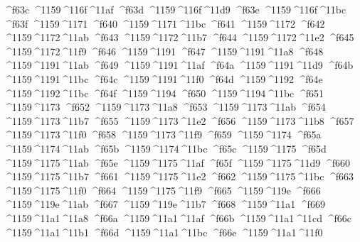 \checkit ^^^^f63c ^^^^1159^^^^116f^^^^11af
\checkit ^^^^f63d ^^^^1159^^^^116f^^^^11d9
\checkit ^^^^f63e ^^^^1159^^^^116f^^^^11bc
\checkit ^^^^f63f ^^^^1159^^^^1171
\checkit ^^^^f640 ^^^^1159^^^^1171^^^^11bc
\checkit ^^^^f641 ^^^^1159^^^^1172
\checkit ^^^^f642 ^^^^1159^^^^1172^^^^11ab
\checkit ^^^^f643 ^^^^1159^^^^1172^^^^11b7
\checkit ^^^^f644 ^^^^1159^^^^1172^^^^11e2
\checkit ^^^^f645 ^^^^1159^^^^1172^^^^11f9
\checkit ^^^^f646 ^^^^1159^^^^1191
\checkit ^^^^f647 ^^^^1159^^^^1191^^^^11a8
\checkit ^^^^f648 ^^^^1159^^^^1191^^^^11ab
\checkit ^^^^f649 ^^^^1159^^^^1191^^^^11af
\checkit ^^^^f64a ^^^^1159^^^^1191^^^^11d9
\checkit ^^^^f64b ^^^^1159^^^^1191^^^^11bc
\checkit ^^^^f64c ^^^^1159^^^^1191^^^^11f0
\checkit ^^^^f64d ^^^^1159^^^^1192
\checkit ^^^^f64e ^^^^1159^^^^1192^^^^11bc
\checkit ^^^^f64f ^^^^1159^^^^1194
\checkit ^^^^f650 ^^^^1159^^^^1194^^^^11bc
\checkit ^^^^f651 ^^^^1159^^^^1173
\checkit ^^^^f652 ^^^^1159^^^^1173^^^^11a8
\checkit ^^^^f653 ^^^^1159^^^^1173^^^^11ab
\checkit ^^^^f654 ^^^^1159^^^^1173^^^^11b7
\checkit ^^^^f655 ^^^^1159^^^^1173^^^^11e2
\checkit ^^^^f656 ^^^^1159^^^^1173^^^^11b8
\checkit ^^^^f657 ^^^^1159^^^^1173^^^^11f0
\checkit ^^^^f658 ^^^^1159^^^^1173^^^^11f9
\checkit ^^^^f659 ^^^^1159^^^^1174
\checkit ^^^^f65a ^^^^1159^^^^1174^^^^11ab
\checkit ^^^^f65b ^^^^1159^^^^1174^^^^11bc
\checkit ^^^^f65c ^^^^1159^^^^1175
\checkit ^^^^f65d ^^^^1159^^^^1175^^^^11ab
\checkit ^^^^f65e ^^^^1159^^^^1175^^^^11af
\checkit ^^^^f65f ^^^^1159^^^^1175^^^^11d9
\checkit ^^^^f660 ^^^^1159^^^^1175^^^^11b7
\checkit ^^^^f661 ^^^^1159^^^^1175^^^^11e2
\checkit ^^^^f662 ^^^^1159^^^^1175^^^^11bc
\checkit ^^^^f663 ^^^^1159^^^^1175^^^^11f0
\checkit ^^^^f664 ^^^^1159^^^^1175^^^^11f9
\checkit ^^^^f665 ^^^^1159^^^^119e
\checkit ^^^^f666 ^^^^1159^^^^119e^^^^11ab
\checkit ^^^^f667 ^^^^1159^^^^119e^^^^11b7
\checkit ^^^^f668 ^^^^1159^^^^11a1
\checkit ^^^^f669 ^^^^1159^^^^11a1^^^^11a8
\checkit ^^^^f66a ^^^^1159^^^^11a1^^^^11af
\checkit ^^^^f66b ^^^^1159^^^^11a1^^^^11cd
\checkit ^^^^f66c ^^^^1159^^^^11a1^^^^11b1
\checkit ^^^^f66d ^^^^1159^^^^11a1^^^^11bc
\checkit ^^^^f66e ^^^^1159^^^^11a1^^^^11f0

\bye
